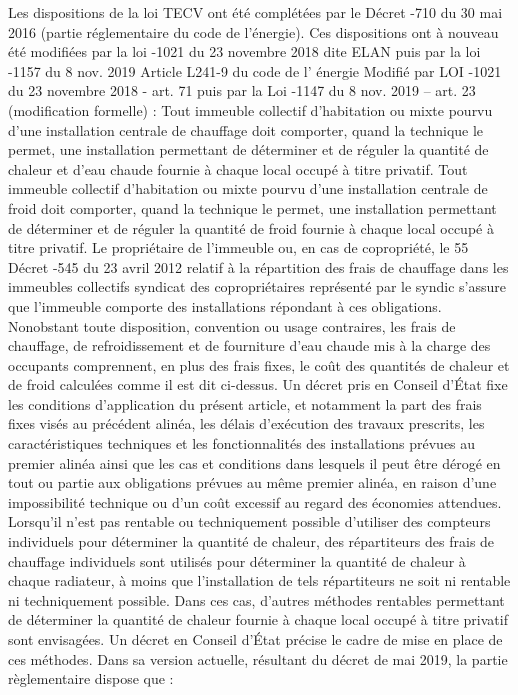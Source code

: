 		Les dispositions de la loi TECV ont été complétées par le Décret -710 du 30 mai 2016 (partie réglementaire du code de l’énergie). Ces dispositions ont à nouveau été modifiées par la loi -1021 du 23 novembre 2018 dite ELAN puis par la loi -1157 du 8 nov. 2019
		Article L241-9 du code de l’ énergie Modifié par LOI -1021 du 23 novembre 2018 - art. 71 puis par la Loi -1147 du 8 nov. 2019 – art. 23 (modification formelle) :
		Tout immeuble collectif d'habitation ou mixte pourvu d'une installation centrale de chauffage doit comporter, quand la technique le permet, une installation permettant de déterminer et de réguler la quantité de chaleur et d'eau chaude fournie à chaque local occupé à titre privatif. Tout immeuble collectif d'habitation ou mixte pourvu d'une installation centrale de froid doit comporter, quand la technique le permet, une installation permettant de déterminer et de réguler la quantité de froid fournie à chaque local occupé à titre privatif. Le propriétaire de l'immeuble ou, en cas de copropriété, le
		55 Décret -545 du 23 avril 2012 relatif à la répartition des frais de chauffage dans les immeubles collectifs
		syndicat des copropriétaires représenté par le syndic s'assure que l'immeuble comporte des installations répondant à ces obligations.
		Nonobstant toute disposition, convention ou usage contraires, les frais de chauffage, de refroidissement et de fourniture d'eau chaude mis à la charge des occupants comprennent, en plus des frais fixes, le coût des quantités de chaleur et de froid calculées comme il est dit ci-dessus.
		Un décret pris en Conseil d'État fixe les conditions d'application du présent article, et notamment la part des frais fixes visés au précédent alinéa, les délais d'exécution des travaux prescrits, les caractéristiques techniques et les fonctionnalités des installations prévues au premier alinéa ainsi que les cas et conditions dans lesquels il peut être dérogé en tout ou partie aux obligations prévues au même premier alinéa, en raison d'une impossibilité technique ou d'un coût excessif au regard des économies attendues.
		Lorsqu'il n'est pas rentable ou techniquement possible d'utiliser des compteurs individuels pour déterminer la quantité de chaleur, des répartiteurs des frais de chauffage individuels sont utilisés pour déterminer la quantité de chaleur à chaque radiateur, à moins que l'installation de tels répartiteurs ne soit ni rentable ni techniquement possible. Dans ces cas, d'autres méthodes rentables permettant de déterminer la quantité de chaleur fournie à chaque local occupé à titre privatif sont envisagées. Un décret en Conseil d'État précise le cadre de mise en place de ces méthodes. Dans sa version actuelle, résultant du décret de mai 2019, la partie règlementaire dispose que :
